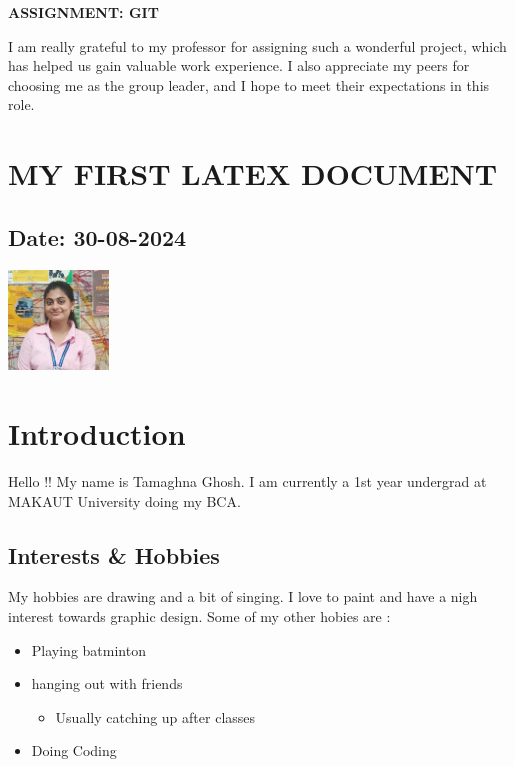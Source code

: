 \documentclass[12pt]{article}
\begin{document}
\begin{center}
\Huge \textbf{ASSIGNMENT: GIT}
\end{center}

I am really grateful to my professor for assigning such a wonderful project, which has helped us gain valuable work experience. I also appreciate my peers for choosing me as the group leader, and I hope to meet their expectations in this role.


\newpage

\section{MY FIRST LATEX DOCUMENT}
\subsection*{Date: 30-08-2024}

\begin{center}
    \includegraphics[width=0.2\textwidth]{tamaghna.jpg}\\[1cm]
    
\end{center}

\section*{Introduction}
Hello !! My name is Tamaghna Ghosh. I am currently a 1st year undergrad at MAKAUT University doing my BCA.

\subsection*{Interests \& Hobbies}
My hobbies are drawing and a bit of singing. I love to paint and have a nigh interest towards graphic design. Some of my other hobies are :

\begin{itemize}
    \item Playing batminton
    \item hanging out with friends
        \begin{itemize}
            \item Usually catching up after classes
        \end{itemize}
    \item Doing Coding
\end{itemize}
\end{document}
